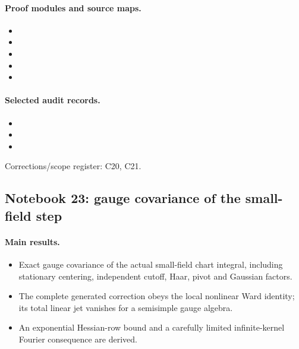 \paragraph{Proof modules and source maps.}
\begingroup\small
\begin{itemize}
\item {}
\item {}
\item {}
\item {}
\item {}
\end{itemize}
\endgroup

\paragraph{Selected audit records.}
\begingroup\small
\begin{itemize}
\item {}
\item {}
\item {}
\end{itemize}
\endgroup
Corrections/scope register: C20, C21.\par

\subsection{Notebook 23: gauge covariance of the small-field step}
\label{hnc-23}
\noindent{}\par

\paragraph{Main results.}
\begin{itemize}
\item Exact gauge covariance of the actual small-field chart integral, including stationary centering, independent cutoff, Haar, pivot and Gaussian factors.
\item The complete generated correction obeys the local nonlinear Ward identity; its total linear jet vanishes for a semisimple gauge algebra.
\item An exponential Hessian-row bound and a carefully limited infinite-kernel Fourier consequence are derived.
\end{itemize}

